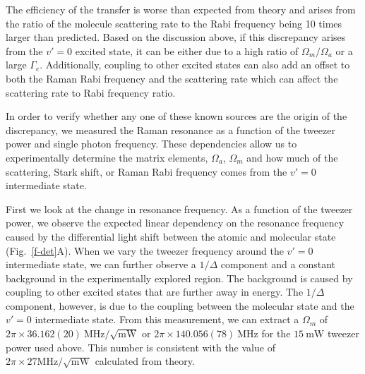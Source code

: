 \documentclass[aps,prl,twocolumn,superscriptaddress]{revtex4-1}
\newcommand{\todo}[1]{}
\begin{document}
The efficiency of the transfer is worse than expected from theory and arises from the ratio of the molecule scattering rate to the Rabi frequency being 10 times larger than predicted.
Based on the discussion above, if this discrepancy arises from the $v'=0$ excited state,
it can be either due to a high ratio of $\Omega_m / \Omega_a$ or a large $\Gamma_e$.
Additionally, coupling to other excited states can also add an offset to
both the Raman Rabi frequency and the scattering rate
which can affect the scattering rate to Rabi frequency ratio.

In order to verify whether any one of these known sources are the origin of the discrepancy,
we measured the Raman resonance as a function of the tweezer power and single photon frequency.
These dependencies allow us to experimentally determine the matrix elements,
$ \Omega_a $, $\Omega_m $ and how much of the scattering, Stark shift,
or Raman Rabi frequency comes from the $ v' = 0$ intermediate state.

First we look at the change in resonance frequency.
As a function of the tweezer power,
we observe the expected linear dependency on the resonance frequency
caused by the differential light shift between the atomic and molecular state (Fig.~\ref{f-det}A).
When we vary the tweezer frequency around the $v'=0$ intermediate state,
we can further observe a $1/\Delta$ component
and a constant background in the experimentally explored region.
The background is caused by coupling to other excited states that are further away in energy.
The $1/\Delta$ component, however, is due to the coupling between the molecular state
and the $v'=0$ intermediate state.
From this measurement, we can extract a $\Omega_m$ of
$2\pi\times36.162(20) ~\mathrm{MHz}/\sqrt{\mathrm{mW}}$ or
$2\pi\times140.056(78) ~\mathrm{MHz}$ for the $15 ~\mathrm{mW}$ tweezer power used above.
This number is consistent with the value of
$2\pi\times27 \mathrm{MHz}/\sqrt{\mathrm{mW}}$ calculated from theory. \todo{ref/sm theory}
\end{document}
